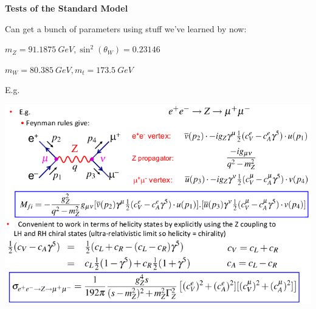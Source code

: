 \textbf{Tests of the Standard Model}

Can get a bunch of parameters using stuff we've learned by now:

$m_Z = \SI{91.1875}{GeV}, \sin^2(\theta_W) = 0.23146$

$m_W = \SI{80.385}{GeV}, m_t = \SI{173.5}{GeV}$

E.g.
\begin{center}
    \includegraphics[width=\linewidth]{images/z_resonance.png}
\end{center}

